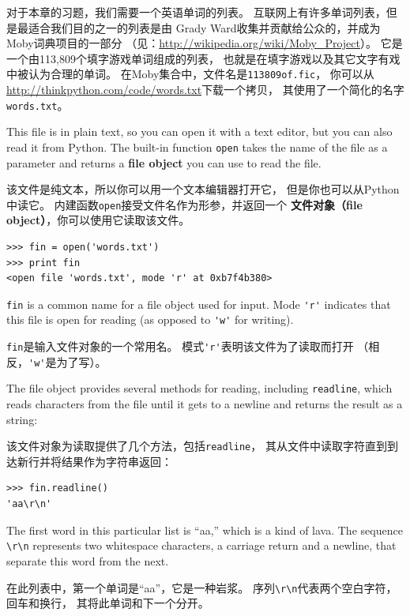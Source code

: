 \documentclass[10pt]{book}
\begin{document}
\begin{CJK}{UTF8}{gbsn}
对于本章的习题，我们需要一个英语单词的列表。
互联网上有许多单词列表，但是最适合我们目的之一的列表是由
Grady Ward收集并贡献给公众的，并成为Moby词典项目的一部分
（见：\url{http://wikipedia.org/wiki/Moby_Project}）。
它是一个由113,809个填字游戏单词组成的列表，
也就是在填字游戏以及其它文字有戏中被认为合理的单词。
在Moby集合中，文件名是{\tt 113809of.fic}，
你可以从\url{http://thinkpython.com/code/words.txt}下载一个拷贝，
其使用了一个简化的名字{\tt words.txt}。

This file is in plain text, so you can open it with a text
editor, but you can also read it from Python.  The built-in
function {\tt open} takes the name of the file as a parameter
and returns a {\bf file object} you can use to read the file.

该文件是纯文本，所以你可以用一个文本编辑器打开它，
但是你也可以从Python中读它。
内建函数{\tt open}接受文件名作为形参，并返回一个
{\bf 文件对象（file object）}，你可以使用它读取该文件。

\begin{verbatim}
>>> fin = open('words.txt')
>>> print fin
<open file 'words.txt', mode 'r' at 0xb7f4b380>
\end{verbatim}
%
{\tt fin} is a common name for a file object used for
input.  Mode \verb"'r'" indicates that this file is open for
reading (as opposed to \verb"'w'" for writing).

{\tt fin}是输入文件对象的一个常用名。
模式\verb"'r'"表明该文件为了读取而打开
（相反，\verb"'w'"是为了写）。

The file object provides several methods for reading, including
{\tt readline}, which reads characters from the file
until it gets to a newline and returns the result as a
string:

该文件对象为读取提供了几个方法，包括{\tt readline}，
其从文件中读取字符直到到达新行并将结果作为字符串返回：

\begin{verbatim}
>>> fin.readline()
'aa\r\n'
\end{verbatim}
%
The first word in this particular list is ``aa,'' which is a kind of
lava.  The sequence \verb"\r\n" represents two whitespace characters,
a carriage return and a newline, that separate this word from the
next.

在此列表中，第一个单词是``aa''，它是一种岩浆。
序列\verb"\r\n"代表两个空白字符，回车和换行，
其将此单词和下一个分开。


\end{CJK}
\end{document}
